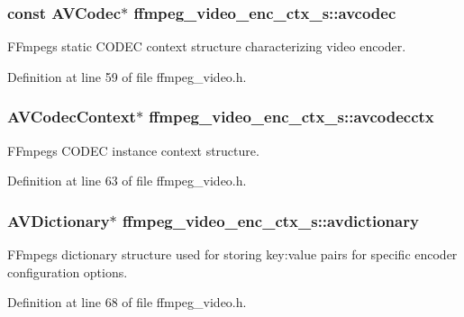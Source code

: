 \subsubsection[{\texorpdfstring{avcodec}{avcodec}}]{\setlength{\rightskip}{0pt plus 5cm}const A\+V\+Codec$\ast$ ffmpeg\+\_\+video\+\_\+enc\+\_\+ctx\+\_\+s\+::avcodec}\hypertarget{structffmpeg__video__enc__ctx__s_aefc9d1d9d634d2421b08663361857713}{}\label{structffmpeg__video__enc__ctx__s_aefc9d1d9d634d2421b08663361857713}
F\+Fmpeg\textquotesingle{}s static C\+O\+D\+EC context structure characterizing video encoder. 

Definition at line 59 of file ffmpeg\+\_\+video.\+h.

\subsubsection[{\texorpdfstring{avcodecctx}{avcodecctx}}]{\setlength{\rightskip}{0pt plus 5cm}A\+V\+Codec\+Context$\ast$ ffmpeg\+\_\+video\+\_\+enc\+\_\+ctx\+\_\+s\+::avcodecctx}\hypertarget{structffmpeg__video__enc__ctx__s_ab16e6b1a593cd2e0439c3ba66524793c}{}\label{structffmpeg__video__enc__ctx__s_ab16e6b1a593cd2e0439c3ba66524793c}
F\+Fmpeg\textquotesingle{}s C\+O\+D\+EC instance context structure. 

Definition at line 63 of file ffmpeg\+\_\+video.\+h.

\subsubsection[{\texorpdfstring{avdictionary}{avdictionary}}]{\setlength{\rightskip}{0pt plus 5cm}A\+V\+Dictionary$\ast$ ffmpeg\+\_\+video\+\_\+enc\+\_\+ctx\+\_\+s\+::avdictionary}\hypertarget{structffmpeg__video__enc__ctx__s_a18bd2ee272daabc7beeedc3a4de58b16}{}\label{structffmpeg__video__enc__ctx__s_a18bd2ee272daabc7beeedc3a4de58b16}
F\+Fmpeg\textquotesingle{}s dictionary structure used for storing key\+:value pairs for specific encoder configuration options. 

Definition at line 68 of file ffmpeg\+\_\+video.\+h.

